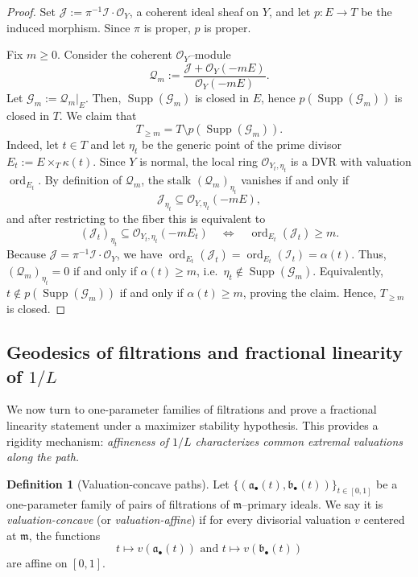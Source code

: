 \documentclass[12pt]{amsart}
\newcommand{\m}{\mathfrak m}
\newcommand{\Supp}{\operatorname{\mathrm{Supp}}}
\newcommand{\ord}{\operatorname{\mathrm{ord}}}
\renewcommand{\a}{\mathfrak{a}}
\renewcommand{\b}{\mathfrak{b}}
\newcommand{\cI}{\mathcal{I}}
\newcommand{\cJ}{\mathcal{J}}
\newcommand{\cO}{\mathcal{O}}
\newcommand{\cQ}{\mathcal{Q}}
\newcommand{\cG}{\mathcal{G}}
\newcommand{\abul}{{\a_\bullet}}
\newcommand{\bbul}{{\b_\bullet}}
\theoremstyle{plain}
\theoremstyle{definition}
\newtheorem{definition}[theorem]{Definition}
\numberwithin{equation}{section}
\begin{document}
\begin{proof}
	Set $\cJ:=\pi^{-1}\cI\cdot\cO_Y$, a coherent ideal sheaf on $Y$, and let $p:E\to T$ be the induced morphism.
	Since $\pi$ is proper, $p$ is proper.
	
	Fix $m\ge 0$. Consider the coherent $\cO_Y$--module
	\[
	\cQ_m:=\frac{\cJ+\cO_Y(-mE)}{\cO_Y(-mE)}.
	\]
	Let $\cG_m:=\cQ_m|_E$. Then, $\Supp(\cG_m)$ is closed in $E$, hence $p(\Supp(\cG_m))$ is closed in $T$.
	We claim that
	\[
	T_{\ge m}=T\setminus p(\Supp(\cG_m)).
	\]
	Indeed, let $t\in T$ and let $\eta_t$ be the generic point of the prime divisor $E_t:=E\times_T\kappa(t)$.
	Since $Y$ is normal, the local ring $\cO_{Y_t,\eta_t}$ is a DVR with valuation $\ord_{E_t}$.
	By definition of $\cQ_m$, the stalk $(\cQ_m)_{\eta_t}$ vanishes if and only if
	\[
	\cJ_{\eta_t}\subseteq \cO_{Y,\eta_t}(-mE),
	\]
	and after restricting to the fiber this is equivalent to
	\[
	(\cJ_t)_{\eta_t}\subseteq \cO_{Y_t,\eta_t}(-mE_t)\quad\Longleftrightarrow\quad \ord_{E_t}(\cJ_t)\ge m.
	\]
	Because $\cJ=\pi^{-1}\cI\cdot\cO_Y$, we have $\ord_{E_t}(\cJ_t)=\ord_{E_t}(\cI_t)=\alpha(t)$.
	Thus, $(\cQ_m)_{\eta_t}=0$ if and only if $\alpha(t)\ge m$, i.e.\ $\eta_t\notin \Supp(\cG_m)$.
	Equivalently, $t\notin p(\Supp(\cG_m))$ if and only if $\alpha(t)\ge m$, proving the claim.
	Hence, $T_{\ge m}$ is closed.
\end{proof}


\subsection{Geodesics of filtrations and fractional linearity of $1/L$}

We now turn to one-parameter families of filtrations and prove a fractional linearity statement
under a maximizer stability hypothesis. This provides a rigidity mechanism:
\emph{affineness of $1/L$ characterizes common extremal valuations along the path.}


\begin{definition}[Valuation-concave paths]\label{def:valuation-concave}
	Let $\{(\abul(t),\bbul(t))\}_{t\in[0,1]}$ be a one-parameter family of pairs of
	filtrations of $\m$--primary ideals.
	We say it is \emph{valuation-concave} (or \emph{valuation-affine}) if for every divisorial valuation $v$ centered at $\m$,
	the functions
	\[
	t\longmapsto v(\abul(t)) \text{ and } t\longmapsto v(\bbul(t))
	\]
	are affine on $[0,1]$.
\end{definition}
\end{document}

